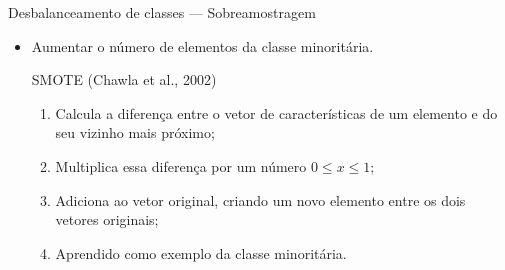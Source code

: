 \documentclass[10pt]{beamer}
\begin{document}
\begin{frame}{Desbalanceamento de classes --- Sobreamostragem}
  \setlength\leftmargini{1em}
    \begin{itemize}
    \item Aumentar o número de elementos da classe minoritária.
    \begin{block}{SMOTE (Chawla et al., 2002)}
      \setlength\leftmargini{1em}
      \begin{enumerate}
        \item Calcula a diferença entre o vetor de características de um elemento e do seu vizinho mais próximo;
        \item Multiplica essa diferença por um número $0 \leq x \leq 1$;
        \item Adiciona ao vetor original, criando um novo elemento entre os dois vetores originais;
        \item Aprendido como exemplo da classe minoritária.
      \end{enumerate}
    \end{block}
  \end{itemize}
\end{frame}
%
\end{document}
